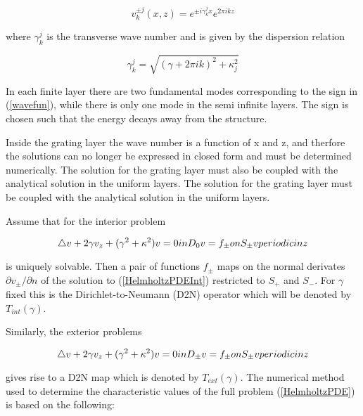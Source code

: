 \begin{equation}
v_k^{\pm j}(x,z) = e^{\pm i \gamma_k^j x} e^{2 \pi ikz}
\label{wavefun}
\end{equation}

where $\gamma_k^j$ is the transverse wave number and is given by the
dispersion relation

\begin{equation}
\gamma_k^j = \sqrt{(\gamma + 2 \pi ik)^2 + \kappa_j^2}
\label{DispRel}
\end{equation}

In each finite layer there are two fundamental modes corresponding to
the sign in (\ref{wavefun}), while there is only one mode in the semi
infinite layers. The sign is chosen such that the energy decays away
from the structure.

Inside the grating layer the wave number is a function of x and z, and
therfore the solutions can no longer be expressed in closed form and
must be determined numerically. The solution for the grating layer
must also be coupled with the analytical solution in the uniform
layers. The solution for the grating layer must be coupled with the
analytical solution in the uniform layers.

Assume that for the interior problem

\begin{equation}
\triangle v + 2 \gamma v_z + (\gamma^2 + \kappa^2)v = 0 in D_0 \\
v = f_\pm on S_\pm \\
v periodic in z
\label{HelmholtzPDEInt}
\end{equation}

is uniquely solvable. Then a pair of functions $f_\pm$ maps on the
normal derivates $\partial{v_\pm}/\partial{n}$ of the solution to
(\ref{HelmholtzPDEInt}) restricted to $S_+$ and $S_-$. For $\gamma$
fixed this is the Dirichlet-to-Neumann (D2N) operator which will be
denoted by $T_{int}(\gamma)$.

Similarly, the exterior problems

\begin{equation}
\triangle v + 2 \gamma v_z + (\gamma^2 + \kappa^2)v = 0 in D_\pm \\
v = f_\pm on S_\pm \\
v periodic in z
\label{HelmholtzPDEExt}
\end{equation}

gives rise to a D2N map which is denoted by $T_{ext}(\gamma)$. The
numerical method used to determine the characteristic values of the
full problem (\ref{HelmholtzPDE}) is based on the following:


